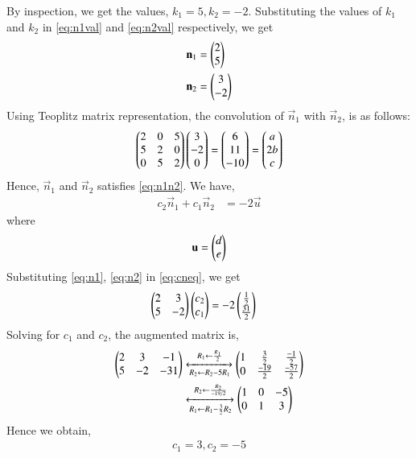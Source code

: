 \documentclass[journal,12pt,twocolumn]{IEEEtran}
\begin{document}
By inspection, we get the values, $k_1 = 5, k_2 = -2$. Substituting the values of $k_1$ and $k_2$ in \eqref{eq:n1val} and \eqref{eq:n2val} respectively, we get
\begin{align}
	\mathbf{n}_1 &= \begin{pmatrix}2 \\ 5\end{pmatrix} \label{eq:n1}\\
	\mathbf{n}_2 &= \begin{pmatrix}3 \\ -2\end{pmatrix} \label{eq:n2}
\end{align}
Using Teoplitz matrix representation, the convolution of $\vec{n}_1$ with $\vec{n}_2$, is as follows:
\begin{align}
	\begin{pmatrix}2 & 0 & 5\\ 5 & 2 & 0\\ 0 & 5 & 2\end{pmatrix}\begin{pmatrix}3\\-2\\0\end{pmatrix} = \begin{pmatrix}6 \\11 \\ -10\end{pmatrix} = \begin{pmatrix}a \\ 2b \\ c\end{pmatrix}
\end{align}
Hence, $\vec{n}_1$ and $\vec{n}_2$ satisfies \eqref{eq:n1n2}.
We have,
\begin{align}
	c_2\vec{n}_1 + c_1\vec{n}_2 &= -2\vec{u} \label{eq:cneq}
\end{align}
where
\begin{align}
	\mathbf{u} = \begin{pmatrix}d \\ e\end{pmatrix}
\end{align}
Substituting \eqref{eq:n1}, \eqref{eq:n2} in \eqref{eq:cneq}, we get
\begin{align}
 \begin{pmatrix}2 & 3\\ 5 & -2\end{pmatrix}\begin{pmatrix}c_2 \\ c_1\end{pmatrix} &= -2\begin{pmatrix}\frac{1}{2} \\ \frac{31}{2}\end{pmatrix}
\end{align}
Solving for $c_1$ and $c_2$, the augmented matrix is,
\begin{align}
	\begin{pmatrix}2 & 3 & -1\\ 5 & -2 & -31\end{pmatrix} &\xleftrightarrow[R_2 \leftarrow R_2 - 5R_1]{R_1 \leftarrow \frac{R_1}{2}} \begin{pmatrix}1 & \frac{3}{2}  & \frac{-1}{2} \\ 0 & \frac{-19}{2} & \frac{-57}{2}\end{pmatrix} \\
	&\xleftrightarrow[R_1 \leftarrow R_1 - \frac{3}{2}R_2]{R_2 \leftarrow \frac{R_2}{-19/2}} \begin{pmatrix}1 & 0 & -5\\0 & 1 & 3\end{pmatrix}
\end{align}
Hence we obtain,
\begin{align}
	c_1 = 3, c_2 = -5
\end{align}
\end{document}
